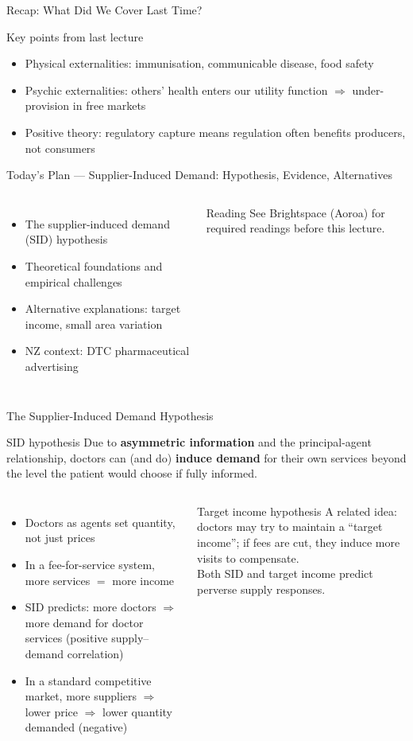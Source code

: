 \documentclass[aspectratio=169, 12pt]{beamer}
\newcommand{\recapslide}[1]{%
  \begin{frame}{Recap: What Did We Cover Last Time?}
    \begin{block}{Key points from last lecture}
      \begin{itemize}#1\end{itemize}
    \end{block}
  \end{frame}}
\newcommand{\planslide}[2]{%
  \begin{frame}{Today's Plan — #1}
    \begin{columns}
      \column{0.6\textwidth}
      \begin{itemize}#2\end{itemize}
      \column{0.38\textwidth}
      \begin{alertblock}{Reading}
        \footnotesize See Brightspace (Aoroa) for required readings before this lecture.
      \end{alertblock}
    \end{columns}
  \end{frame}}
\begin{document}
\recapslide{
  \item Physical externalities: immunisation, communicable disease, food safety
  \item Psychic externalities: others' health enters our utility function $\Rightarrow$ under-provision in free markets
  \item Positive theory: regulatory capture means regulation often benefits producers, not consumers
}

\planslide{Supplier-Induced Demand: Hypothesis, Evidence, Alternatives}{
  \item The supplier-induced demand (SID) hypothesis
  \item Theoretical foundations and empirical challenges
  \item Alternative explanations: target income, small area variation
  \item NZ context: DTC pharmaceutical advertising
}

\begin{frame}{The Supplier-Induced Demand Hypothesis}
  \begin{block}{SID hypothesis}
    Due to \textbf{asymmetric information} and the principal-agent relationship, doctors can
    (and do) \textbf{induce demand} for their own services beyond the level the patient would
    choose if fully informed.
  \end{block}
  \vspace{0.3em}
  \begin{columns}
      \begin{itemize}
        \item Doctors as agents set quantity, not just prices
        \item In a fee-for-service system, more services $=$ more income
        \item SID predicts: more doctors $\Rightarrow$ more demand for doctor services
              (positive supply--demand correlation)
        \item In a standard competitive market, more suppliers $\Rightarrow$ lower price
              $\Rightarrow$ lower quantity demanded (negative)
      \end{itemize}
      \begin{alertblock}{Target income hypothesis}
        A related idea: doctors may try to maintain a ``target income''; if fees are cut,
        they induce more visits to compensate.\\[0.3em]
        Both SID and target income predict perverse supply responses.
      \end{alertblock}
  \end{columns}
\end{frame}
\end{document}
